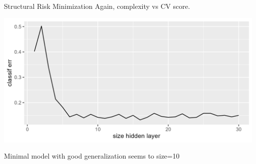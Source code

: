 \documentclass[11pt,compress,t,notes=noshow, xcolor=table]{beamer}
\begin{document}
\begin{frame} {Structural Risk Minimization}
Again, complexity vs CV score. 

\begin{center}\includegraphics[width=\textwidth]{figure/classifi_nn_err_size.png}\end{center}

Minimal model with good generalization seems to size=10 

\end{frame}
\end{document}
